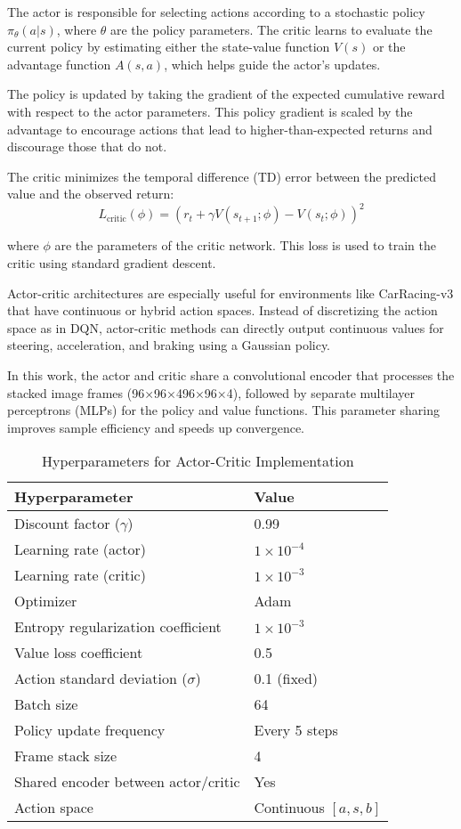 \documentclass[conference]{IEEEtran}
\begin{document}
The actor is responsible for selecting actions according to a stochastic policy$\pi_{\theta}(a | s)$, where $\theta$ are the policy parameters. The critic learns to evaluate the current policy by estimating either the state-value function $V(s)$ or the advantage function $A(s, a)$, which helps guide the actor's updates.

The policy is updated by taking the gradient of the expected cumulative reward with respect to the actor parameters. This policy gradient is scaled by the advantage to encourage actions that lead to higher-than-expected returns and discourage those that do not.

The critic minimizes the temporal difference (TD) error between the predicted value and the observed return: $$L_{\text{critic}}(\phi) = (r_t + \gamma V(s_{t+1};\phi) - V(s_t;\phi))^2$$

where $\phi$ are the parameters of the critic network. This loss is used to train the critic using standard gradient descent.

Actor-critic architectures are especially useful for environments like CarRacing-v3 that have continuous or hybrid action spaces. Instead of discretizing the action space as in DQN, actor-critic methods can directly output continuous values for steering, acceleration, and braking using a Gaussian policy.

In this work, the actor and critic share a convolutional encoder that processes the stacked image frames (96×96×496×96×4), followed by separate multilayer perceptrons (MLPs) for the policy and value functions. This parameter sharing improves sample efficiency and speeds up convergence.

\begin{table}[ht]
\centering
\caption{Hyperparameters for Actor-Critic Implementation}
\label{tab:ac_hyperparams}
\begin{tabular}{ll}
\toprule
\textbf{Hyperparameter} & \textbf{Value} \\
\midrule
Discount factor ($\gamma$)         & 0.99 \\
Learning rate (actor)              & $1 \times 10^{-4}$ \\
Learning rate (critic)             & $1 \times 10^{-3}$ \\
Optimizer                          & Adam \\
Entropy regularization coefficient & $1 \times 10^{-3}$ \\
Value loss coefficient             & 0.5 \\
Action standard deviation ($\sigma$) & 0.1 (fixed) \\
Batch size                         & 64 \\
Policy update frequency            & Every 5 steps \\
Frame stack size                   & 4 \\
Shared encoder between actor/critic & Yes \\
Action space                       & Continuous $[a, s, b]$ \\
\bottomrule
\end{tabular}
\end{table}
\end{document}

